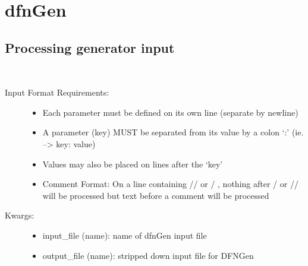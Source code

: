 \documentclass[letterpaper,10pt,english]{sphinxmanual}
\begin{document}
\section{dfnGen}
\label{\detokenize{pydfnworks:dfngen}}

\subsection{Processing generator input}
\label{\detokenize{pydfnworks:processing-generator-input}}\label{\detokenize{pydfnworks:module-pydfnworks.gen_input}}

\begin{fulllineitems}
\label{\detokenize{pydfnworks:pydfnworks.gen_input.check_input}}~\begin{description}
\item[{Input Format Requirements:  }] \leavevmode\begin{itemize}
\item {} 
Each parameter must be defined on its own line (separate by newline)

\item {} 
A parameter (key) MUST be separated from its value by a colon `:' (ie. --\textgreater{} key: value)

\item {} 
Values may also be placed on lines after the `key'

\item {} 
Comment Format:  On a line containing  // or / \sphinxcode{*}, nothing after \sphinxcode{*} / or // will be processed  but text before a comment will be processed

\end{itemize}

\item[{Kwargs:}] \leavevmode\begin{itemize}
\item {} 
input\_file (name): name of dfnGen input file

\item {} 
output\_file (name): stripped down input file for DFNGen

\end{itemize}

\end{description}

\end{fulllineitems}
\end{document}
